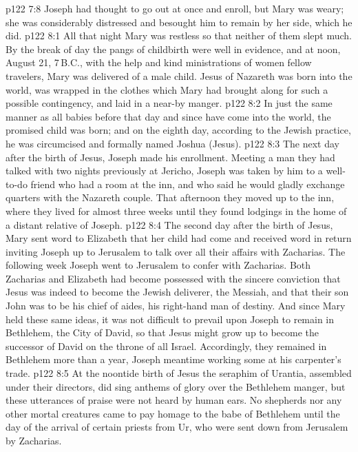 \vs p122 7:8 Joseph had thought to go out at once and enroll, but Mary was weary; she was considerably distressed and besought him to remain by her side, which he did.
\vs p122 8:1 All that night Mary was restless so that neither of them slept much. By the break of day the pangs of childbirth were well in evidence, and at noon, August 21, 7\,B.C., with the help and kind ministrations of women fellow travelers, Mary was delivered of a male child. Jesus of Nazareth was born into the world, was wrapped in the clothes which Mary had brought along for such a possible contingency, and laid in a near\hyp{}by manger.
\vs p122 8:2 In just the same manner as all babies before that day and since have come into the world, the promised child was born; and on the eighth day, according to the Jewish practice, he was circumcised and formally named Joshua (Jesus).
\vs p122 8:3 The next day after the birth of Jesus, Joseph made his enrollment. Meeting a man they had talked with two nights previously at Jericho, Joseph was taken by him to a well\hyp{}to\hyp{}do friend who had a room at the inn, and who said he would gladly exchange quarters with the Nazareth couple. That afternoon they moved up to the inn, where they lived for almost three weeks until they found lodgings in the home of a distant relative of Joseph.
\vs p122 8:4 The second day after the birth of Jesus, Mary sent word to Elizabeth that her child had come and received word in return inviting Joseph up to Jerusalem to talk over all their affairs with Zacharias. The following week Joseph went to Jerusalem to confer with Zacharias. Both Zacharias and Elizabeth had become possessed with the sincere conviction that Jesus was indeed to become the Jewish deliverer, the Messiah, and that their son John was to be his chief of aides, his right\hyp{}hand man of destiny. And since Mary held these same ideas, it was not difficult to prevail upon Joseph to remain in Bethlehem, the City of David, so that Jesus might grow up to become the successor of David on the throne of all Israel. Accordingly, they remained in Bethlehem more than a year, Joseph meantime working some at his carpenter’s trade.
\vs p122 8:5 \pc At the noontide birth of Jesus the seraphim of Urantia, assembled under their directors, did sing anthems of glory over the Bethlehem manger, but these utterances of praise were not heard by human ears. No shepherds nor any other mortal creatures came to pay homage to the babe of Bethlehem until the day of the arrival of certain priests from Ur, who were sent down from Jerusalem by Zacharias.
